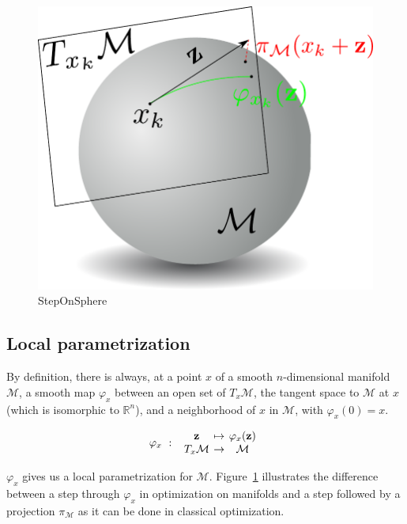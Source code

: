 \begin{figure}[htpb]
  \centering
  \includegraphics[width=0.5\linewidth]{Humanoids2015/stepOnSphere.pdf}
  \caption{StepOnSphere}
\label{fig:stepOnSphere}
\end{figure}


\subsection{Local parametrization}
By definition, there is always, at a point $x$ of a smooth $n$-dimensional manifold $\mathcal{M}$, a smooth map $\varphi_x$ between an open set of $T_x\mathcal{M}$, the tangent space to $\mathcal{M}$ at $x$(which is isomorphic to $\mathbb{R}^n$), and a neighborhood of $x$ in $\mathcal{M}$, with $\varphi_x(0) = x$.

\begin{equation}
  \varphi_x\ :\
  \begin{array}{ccc}
    \mathbf{z} & \reduce{\mapsto}{6} & \varphi_x(\mathbf{z}) \\
    T_x\mathcal{M} & \reduce{\rightarrow}{6} & \mathcal{M}
  \end{array} \nonumber%
\end{equation}

$\varphi_x$ gives us a local parametrization for $\mathcal{M}$.
Figure~\ref{fig:stepOnSphere} illustrates the difference between a step through $\varphi_x$ in optimization on manifolds and a step followed by a projection $\pi_\mathcal{M}$ as it can be done in classical optimization.

